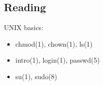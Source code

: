 \documentclass[xga]{xdvislides}
\begin{document}
\subsection{Reading}
UNIX basics:
\begin{itemize}
	\item chmod(1), chown(1), ls(1)
	\item intro(1), login(1), passwd(5)
	\item su(1), sudo(8)
\end{itemize}

%
%
\end{document}
